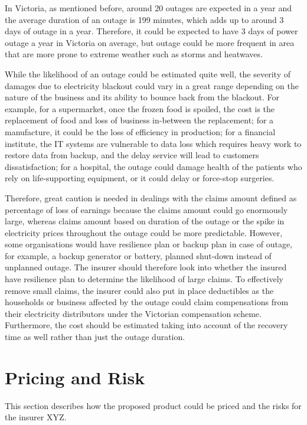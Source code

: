 \documentclass[12pt]{article}
\begin{document}
\begin{flushleft}
In Victoria, as mentioned before, around 20 outages are expected in a year and the average duration of an outage is 199 minutes, which adds up to around 3 days of outage in a year. Therefore, it could be expected to have 3 days of power outage a year in Victoria on average, but outage could be more frequent in area that are more prone to extreme weather such as storms and heatwaves. \par 
While the likelihood of an outage could be estimated quite well, the severity of damages due to electricity blackout could vary in a great range depending on the nature of the business and its ability to bounce back from the blackout. For example, for a supermarket, once the frozen food is spoiled, the cost is the replacement of food and loss of business in-between the replacement; for a manufacture, it could be the loss of efficiency in production; for a financial institute, the IT systems are vulnerable to data loss which requires heavy work to restore data from backup, and the delay service will lead to customers dissatisfaction; for a hospital, the outage could damage health of the patients who rely on life-supporting equipment, or it could delay or force-stop surgeries. \par
Therefore, great caution is needed in dealings with the claims amount defined as percentage of loss of earnings because the claims amount could go enormously large, whereas claims amount based on duration of the outage or the spike in electricity prices throughout the outage could be more predictable. However, some organisations would have resilience plan or backup plan in case of outage, for example, a backup generator or battery, planned shut-down instead of unplanned outage. The insurer should therefore look into whether the insured have resilience plan to determine the likelihood of large claims. To effectively remove small claims, the insurer could also put in place deductibles as the households or business affected by the outage could claim compensations from their electricity distributors under the Victorian compensation scheme. Furthermore, the cost should be estimated taking into account of the recovery time as well rather than just the outage duration. \par
\end{flushleft}
\newpage


\section{Pricing and Risk}
This section describes how the proposed product could be priced and the risks for the insurer XYZ. 
\end{document}
